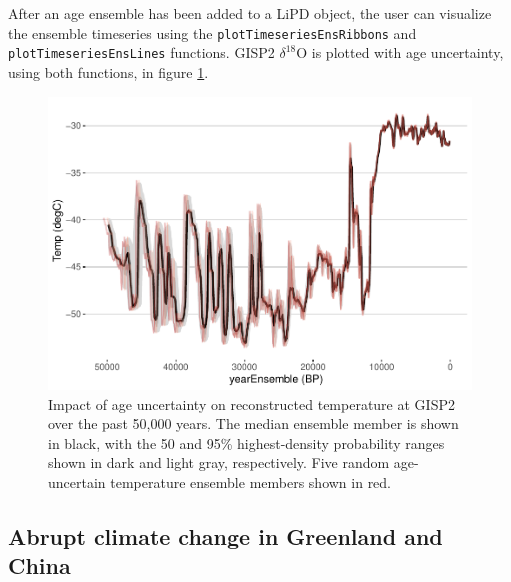 \documentclass[gchron, manuscript]{copernicus}
\begin{document}
After an age ensemble has been added to a LiPD object, the user can visualize the ensemble timeseries using the \newline \texttt{plotTimeseriesEnsRibbons} and \texttt{plotTimeseriesEnsLines} functions.
GISP2 \(\delta^{18}\)O is plotted with age uncertainty, using both functions, in figure \ref{fig:timeseries}.

\begin{figure}
\includegraphics[width=12cm]{geoChronR-paper_files/figure-latex/timeseries-1} \caption{Impact of age uncertainty on reconstructed temperature at GISP2 over the past 50,000 years. The median ensemble member is shown in black, with the 50 and 95\% highest-density probability ranges shown in dark and light gray, respectively. Five random age-uncertain temperature ensemble members shown in red.}\label{fig:timeseries}
\end{figure}

\subsection{Abrupt climate change in Greenland and China}
\end{document}
